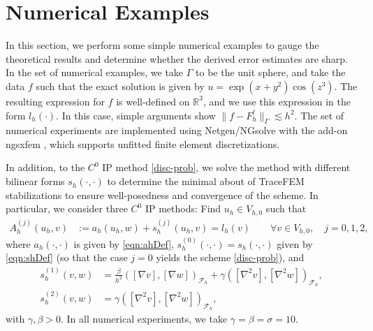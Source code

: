 \documentclass[10pt, a4paper]{amsart}
\newcommand{\bbR}{\mathbb{R}}
\newcommand{\nab}{\nabla}
\newcommand{\calE}{\mathcal{E}}
\newcommand{\calF}{\mathcal{F}}
\newcommand{\calK}{\mathcal{K}}
\theoremstyle{definition}
\theoremstyle{remark}
\theoremstyle{example}
\numberwithin{equation}{section}
\begin{document}
\section{Numerical Examples}\label{sec-numerics}
In this section, we perform 
some simple numerical examples to gauge
the theoretical results and determine whether the derived
error estimates are sharp. In the set of numerical examples,
we take $\Gamma$ to be the unit sphere, and take the data $f$
such that the exact solution is given by $u = \exp(x+y^2)\cos(z^3)$.
The resulting expression for $f$ is well-defined on $\bbR^3$,
and we use this expression in the form $l_h(\cdot)$.
In this case, simple arguments show $\|f-F_h^\ell\|_{\Gamma}\lesssim h^2$.
The set of numerical experiments are implemented using
Netgen/NGsolve \cite{ngsolve} with the add-on ngsxfem \cite{LHPvW21}, which supports unfitted
finite element discretizations.


In addition, to the $C^0$ IP method \eqref{disc-prob},
we solve the method with different
bilinear forms $s_h(\cdot,\cdot)$
to determine the minimal about of TraceFEM stabilizations
to ensure well-posedness and convergence of the scheme.
In particular, we consider three $C^0$ IP methods: Find $u_h\in V_{h,0}$ such that
\begin{align}\label{eqn:General-C0IP}
A^{(j)}_h(u_h, v)
& := a_h(u_h, w) + s_h^{(j)}(u_h, v)= l_h(v)\qquad \forall v\in V_{h,0},\quad j=0,1,2,%
\end{align}
where $a_h(\cdot,\cdot)$ is given by \eqref{eqn:ahDef}, $s_h^{(0)}(\cdot,\cdot) = s_h(\cdot,\cdot)$
given by \eqref{eqn:shDef} (so that the case $j=0$ yields the scheme \eqref{disc-prob}), and 
\begin{align}
s_h^{(1)}(v, w)
& = \frac{\beta}{h^2}([\nab v], [\nab w])_{\calF_h} + \gamma([\nab^2v], [\nab^2w])_{\calF_h}, \label{5.1} \\
s_h^{(2)}(v, w)
& = \gamma
([\nab^2v], [\nab^2w])_{\calF_h}, \label{5.2}
\end{align}
with $\gamma,\beta>0$. In all numerical experiments, we take $\gamma = \beta = \sigma=10$.
\end{document}
